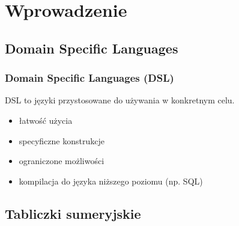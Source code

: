 \section{Wprowadzenie}

\subsection{Domain Specific Languages}


\begin{frame}
     \frametitle{Domain Specific Languages (DSL)}
     
     DSL to języki przystosowane do używania w konkretnym celu.
     \begin{itemize}
          \item
          łatwość użycia
          \item
          specyficzne konstrukcje
          \item 
          ograniczone możliwości
          \item
          kompilacja do języka niższego poziomu (np. SQL)
     \end{itemize}


\end{frame}

\subsection{Tabliczki sumeryjskie}


